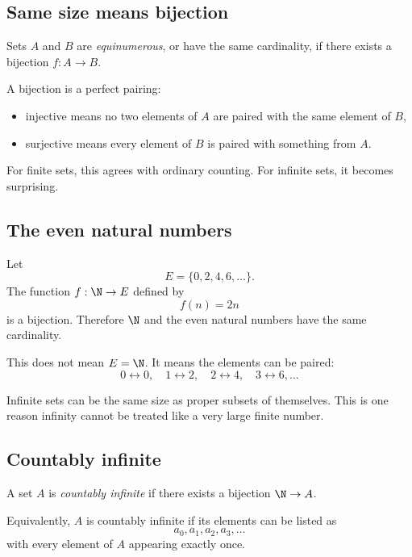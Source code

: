 \subsection{Same size means bijection}

\begin{definition}
Sets $A$ and $B$ are \emph{equinumerous}, or have the same cardinality, if there exists a bijection $f:A\to B$.
\end{definition}

A bijection is a perfect pairing:

\begin{itemize}
\item injective means no two elements of $A$ are paired with the same element of $B$,
\item surjective means every element of $B$ is paired with something from $A$.
\end{itemize}

For finite sets, this agrees with ordinary counting. For infinite sets, it becomes surprising.

\subsection{The even natural numbers}

Let
\[
E=\{0,2,4,6,\ldots\}.
\]
The function $f:\N\to E$ defined by
\[
f(n)=2n
\]
is a bijection. Therefore $\N$ and the even natural numbers have the same cardinality.

This does not mean $E=\N$. It means the elements can be paired:
\[
0\leftrightarrow0,\quad 1\leftrightarrow2,\quad 2\leftrightarrow4,\quad 3\leftrightarrow6,\ldots
\]

\begin{intuitionbox}
Infinite sets can be the same size as proper subsets of themselves. This is one reason infinity cannot be treated like a very large finite number.
\end{intuitionbox}

\subsection{Countably infinite}

\begin{definition}
A set $A$ is \emph{countably infinite} if there exists a bijection $\N\to A$.
\end{definition}

Equivalently, $A$ is countably infinite if its elements can be listed as
\[
a_0,a_1,a_2,a_3,\ldots
\]
with every element of $A$ appearing exactly once.

